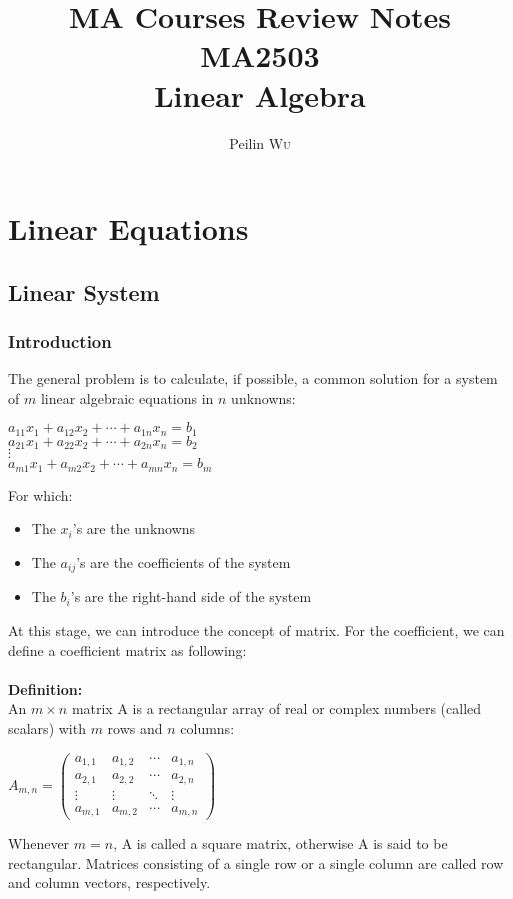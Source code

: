 \documentclass[UTF8,a4paper, 10pt, openany]{svmono}
\title{MA Courses Review Notes\\MA2503 \\Linear Algebra}
\author{Peilin \textsc{Wu}
}
\begin{document}
\maketitle

\frontmatter
\tableofcontents

\mainmatter
\chapter{Linear Equations}
\section{Linear System}
\subsection{Introduction}
The general problem is to calculate, if possible, a common solution
for a system of $m$ linear algebraic equations in $n$ unknowns:

\begin{center}
$a_{11}x_1+a_{12}x_{2}+\cdots +a_{1n}x_{n} = b_{1}$\\
$a_{21}x_1+a_{22}x_{2}+\cdots +a_{2n}x_{n} = b_{2}$\\
$\vdots$\\
$a_{m1}x_1+a_{m2}x_{2}+\cdots +a_{mn}x_{n} = b_{m}$\\
\end{center}

For which:
\begin{itemize}
\item{The $x_i$'s are the unknowns}
\item{The $a_{ij}$'s are the coefficients of the system}
\item{The $b_i$'s are the right-hand side of the system}
\end{itemize}
At this stage, we can introduce the concept of matrix. For the coefficient, we can define a coefficient matrix as following:\\ \\
\textbf{Definition:}
\\An $m \times n$ matrix A is a rectangular array of real or complex numbers (called scalars) with $m$ rows and $n$ columns:
\begin{center}
$A_{m,n}=  
 \begin{pmatrix}
  a_{1,1} & a_{1,2} & \cdots & a_{1,n} \\
  a_{2,1} & a_{2,2} & \cdots & a_{2,n} \\
  \vdots  & \vdots  & \ddots & \vdots  \\
  a_{m,1} & a_{m,2} & \cdots & a_{m,n} 
 \end{pmatrix}$\\
\end{center}
Whenever $m = n$, A is called a square matrix, otherwise A is said to be rectangular. Matrices consisting of a single row or a single column are called row and column vectors, respectively. 
\end{document}
